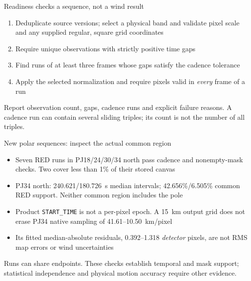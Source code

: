 \documentclass[aspectratio=169,11pt]{beamer}
\newcommand{\currevsec}{}
\newcommand{\revsec}[1]{\gdef\currevsec{#1}}
\begin{document}
\begin{frame}{Readiness checks a sequence, not a wind result}
  \revsec{4.19}
\begin{enumerate}
    \item Deduplicate source versions; select a physical band and validate pixel scale and any supplied regular, square grid coordinates
    \item Require unique observations with strictly positive time gaps
    \item Find runs of at least three frames whose gaps satisfy the cadence tolerance
    \item Apply the selected normalization and require pixels valid in \emph{every} frame of a run
  \end{enumerate}
  \vspace{0.2cm}
  Report observation count, gaps, cadence runs and explicit failure reasons. A cadence run can contain several sliding triples; its count is not the number of all triples.
\end{frame}

\begin{frame}{New polar sequences: inspect the actual common region}
  \revsec{4.19}
  \begin{itemize}
    \item Seven RED runs in PJ18/24/30/34 north pass cadence and nonempty-mask checks. Two cover less than 1\% of their stored canvas
    \item PJ34 north: 240.621/180.726~s median intervals; 42.656\%/6.505\% common RED support. Neither common region includes the pole
    \item Product \texttt{START\_TIME} is not a per-pixel epoch. A 15~km output grid does not erase PJ34 native sampling of 41.61--10.50~km/pixel
    \item Its fitted median-absolute residuals, 0.392--1.318 \emph{detector} pixels, are not RMS map errors or wind uncertainties
  \end{itemize}
  \vspace{0.2cm}
  Runs can share endpoints. These checks establish temporal and mask support; statistical independence and physical motion accuracy require other evidence.
\end{frame}
\end{document}
